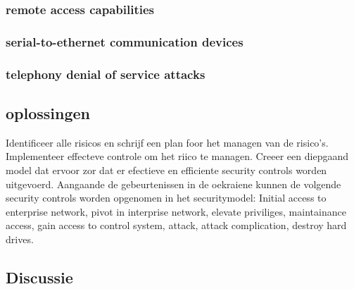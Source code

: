 \subsubsection{remote access capabilities}
\subsubsection{serial-to-ethernet communication devices}
\subsubsection{telephony denial of service attacks}

\subsection{oplossingen}
Identificeer alle risicos en schrijf een plan foor het managen van de risico's.
Implementeer  effecteve controle  om het riico te managen.
Creeer een diepgaand model dat ervoor zor dat er efectieve en efficiente security controls worden uitgevoerd.
Aangaande de gebeurtenissen in de oekraiene kunnen de volgende security controls worden opgenomen in het securitymodel: Initial access to enterprise network, pivot in interprise network, elevate priviliges, maintainance access, gain access to control system, attack, attack complication, destroy hard drives.
\cite{Whitehead2017ukrainepoweroutage}

\subsection{Discussie}

